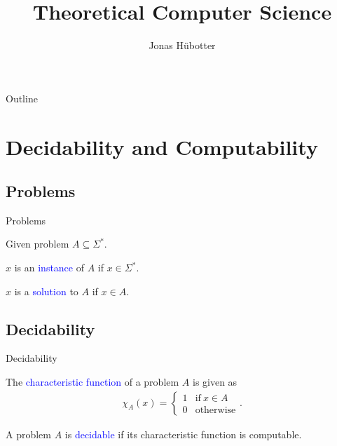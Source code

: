 \documentclass{beamer}
\title[Theoretical Computer Science]{Theoretical Computer Science}
\author{Jonas Hübotter}
\date{}
\theoremstyle{definition}
\def\spadding{\vspace{0.25cm}}
\def\b{\textcolor{blue}}
\begin{document}
\begin{frame}
  \titlepage
\end{frame}

\begin{frame}[allowframebreaks]{Outline}
  \tableofcontents[subsubsectionstyle=hide]
 \end{frame}

\section{Decidability and Computability}

\subsection{Problems}

\begin{frame}{Problems}

Given problem $A \subseteq \Sigma^*$.\spadding

\begin{definition}
$x$ is an \b{instance} of $A$ if $x \in \Sigma^*$.\par
$x$ is a \b{solution} to $A$ if $x \in A$.
\end{definition}

\end{frame}

\subsection{Decidability}

\begin{frame}{Decidability}

\begin{definition}
The \b{characteristic function} of a problem $A$ is given as
\begin{align*}
    \chi_A(x) = \begin{cases}
                    1 & \text{if}\ x \in A \\
                    0 & \text{otherwise}
                \end{cases}.
\end{align*}
\end{definition}

\begin{definition}
A problem $A$ is \b{decidable} if its characteristic function is computable.
\end{definition}

\end{frame}
\end{document}
